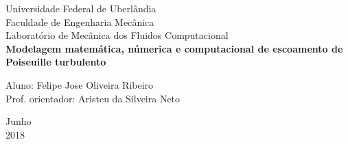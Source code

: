 \begin{titlepage}
	\begin{center}
	

		\Huge{Universidade Federal de Uberlândia}\\
		\large{Faculdade de Engenharia Mecânica}\\ 
		\large{Laboratório de Mecânica dos Fluidos Computacional}\\ 
		\vspace{15pt}
        \vspace{95pt}
        \textbf{\LARGE{Modelagem matemática, númerica e computacional de escoamento de Poiseuille
        		turbulento}}\\
		\vspace{7,5cm}
	\end{center}
	
	\begin{flushleft}
		\begin{tabbing}
			Aluno: Felipe Jose Oliveira Ribeiro \\
			Prof. orientador: Aristeu da Silveira Neto \\
	    \end{tabbing}
    \end{flushleft}
	\vspace{1cm}
	
	\begin{center}
		\vspace{\fill}
			 Junho\\
		 2018
			\end{center}
\end{titlepage}

